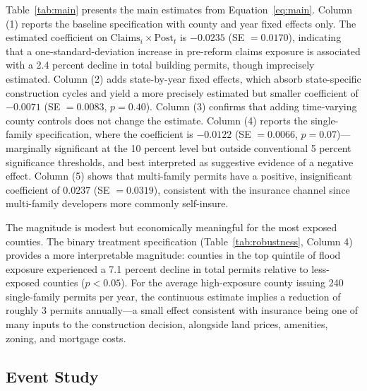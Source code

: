 \documentclass[12pt]{article}
\begin{document}
Table~\ref{tab:main} presents the main estimates from Equation~\ref{eq:main}. Column (1) reports the baseline specification with county and year fixed effects only. The estimated coefficient on $\text{Claims}_i \times \text{Post}_t$ is $-0.0235$ (SE $= 0.0170$), indicating that a one-standard-deviation increase in pre-reform claims exposure is associated with a 2.4 percent decline in total building permits, though imprecisely estimated. Column (2) adds state-by-year fixed effects, which absorb state-specific construction cycles and yield a more precisely estimated but smaller coefficient of $-0.0071$ (SE $= 0.0083$, $p = 0.40$). Column (3) confirms that adding time-varying county controls does not change the estimate. Column (4) reports the single-family specification, where the coefficient is $-0.0122$ (SE $= 0.0066$, $p = 0.07$)---marginally significant at the 10 percent level but outside conventional 5 percent significance thresholds, and best interpreted as suggestive evidence of a negative effect. Column (5) shows that multi-family permits have a positive, insignificant coefficient of $0.0237$ (SE $= 0.0319$), consistent with the insurance channel since multi-family developers more commonly self-insure.

The magnitude is modest but economically meaningful for the most exposed counties. The binary treatment specification (Table~\ref{tab:robustness}, Column 4) provides a more interpretable magnitude: counties in the top quintile of flood exposure experienced a 7.1 percent decline in total permits relative to less-exposed counties ($p < 0.05$). For the average high-exposure county issuing 240 single-family permits per year, the continuous estimate implies a reduction of roughly 3 permits annually---a small effect consistent with insurance being one of many inputs to the construction decision, alongside land prices, amenities, zoning, and mortgage costs.

\subsection{Event Study}


\end{document}
